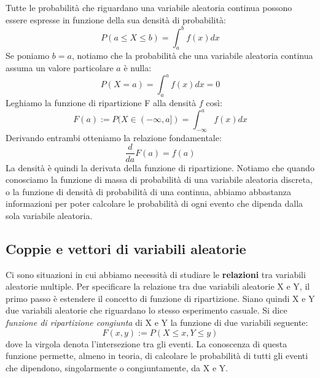 \documentclass[11pt]{article}
\begin{document}
Tutte le probabilità che riguardano una variabile aleatoria continua possono essere espresse in funzione della sua densità di probabilità:
\begin{displaymath}
    P(a\le X \le b) = \int_a^b f(x)dx
\end{displaymath}
Se poniamo $b=a$, notiamo che la probabilità che una variabile aleatoria continua assuma un valore particolare $a$ è nulla:
\begin{displaymath}
    P(X=a) = \int_a^a f(x)dx = 0
\end{displaymath}
Leghiamo la funzione di ripartizione F alla densità $f$ così:
\begin{displaymath}
    F(a) := P(X \in (-\infty,a]) = \int_{-\infty}^a f(x)dx
\end{displaymath}
Derivando entrambi otteniamo la relazione fondamentale:
\begin{displaymath}
    \frac{d}{da}F(a) = f(a)
\end{displaymath}
La densità è quindi la derivata della funzione di ripartizione. 
Notiamo che quando conosciamo la funzione di massa di probabilità di una variabile aleatoria discreta, o la funzione di densità di probabilità di una continua, abbiamo abbastanza informazioni per poter calcolare le probabilità di ogni evento che dipenda dalla sola variabile aleatoria. 
\subsection{Coppie e vettori di variabili aleatorie}
Ci sono situazioni in cui abbiamo necessità di studiare le \textbf{relazioni} tra variabili aleatorie multiple. Per specificare la relazione tra due variabili aleatorie X e Y, il primo passo è estendere il concetto di funzione di ripartizione.
Siano quindi X e Y due variabili aleatorie che riguardano lo stesso esperimento casuale. Si dice \textit{funzione di ripartizione congiunta} di X e Y la funzione di due variabili seguente:
\begin{displaymath}
    F(x,y) := P(X\le x, Y \le y)
\end{displaymath}
dove la virgola denota l'intersezione tra gli eventi.
La conoscenza di questa funzione permette, almeno in teoria, di calcolare le probabilità di tutti gli eventi che dipendono, singolarmente o congiuntamente, da X e Y. 
\end{document}
